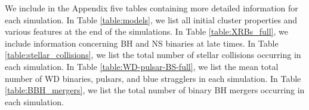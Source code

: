 \documentclass[twocolumn,tighten]{aastex63}
\begin{document}
{{{{{{\appendix

We include in the Appendix five tables containing more detailed information for each simulation. In Table \ref{table:models}, we list all initial cluster properties and various features at the end of the simulations. In Table \ref{table:XRBs_full}, we include information concerning BH and NS binaries at late times. In Table \ref{table:stellar_collisions}, we list the total number of stellar collisions occurring in each simulation. In Table \ref{table:WD-pulsar-BS-full}, we list the mean total number of WD binaries, pulsars, and blue stragglers in each simulation. In Table \ref{table:BBH_mergers}, we list the total number of binary BH mergers occurring in each simulation.

\setcounter{table}{0}
\renewcommand{\thetable}{A\arabic{table}}

}}}}}}
\end{document}
